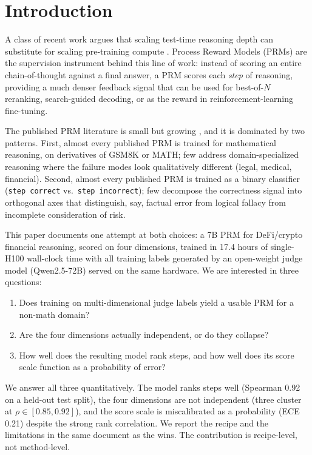 \documentclass[10pt,letterpaper]{article}
\begin{document}
\section{Introduction}

A class of recent work argues that scaling test-time reasoning depth can substitute for scaling pre-training compute \cite{lightman2023verify, deepseek2025r1}. Process Reward Models (PRMs) are the supervision instrument behind this line of work: instead of scoring an entire chain-of-thought against a final answer, a PRM scores each \emph{step} of reasoning, providing a much denser feedback signal that can be used for best-of-$N$ reranking, search-guided decoding, or as the reward in reinforcement-learning fine-tuning.

The published PRM literature is small but growing \cite{wang2024mathshepherd, wang2024openr, luo2024omegaprm}, and it is dominated by two patterns. First, almost every published PRM is trained for mathematical reasoning, on derivatives of GSM8K or MATH; few address domain-specialized reasoning where the failure modes look qualitatively different (legal, medical, financial). Second, almost every published PRM is trained as a binary classifier (\texttt{step correct} vs.\ \texttt{step incorrect}); few decompose the correctness signal into orthogonal axes that distinguish, say, factual error from logical fallacy from incomplete consideration of risk.

This paper documents one attempt at both choices: a 7B PRM for DeFi/crypto financial reasoning, scored on four dimensions, trained in 17.4 hours of single-H100 wall-clock time with all training labels generated by an open-weight judge model (Qwen2.5-72B) served on the same hardware. We are interested in three questions:
\begin{enumerate}[leftmargin=*]
    \item Does training on multi-dimensional judge labels yield a usable PRM for a non-math domain?
    \item Are the four dimensions actually independent, or do they collapse?
    \item How well does the resulting model rank steps, and how well does its score scale function as a probability of error?
\end{enumerate}

We answer all three quantitatively. The model ranks steps well (Spearman 0.92 on a held-out test split), the four dimensions are not independent (three cluster at $\rho \in [0.85, 0.92]$), and the score scale is miscalibrated as a probability (ECE 0.21) despite the strong rank correlation. We report the recipe and the limitations in the same document as the wins. The contribution is recipe-level, not method-level.
\end{document}
